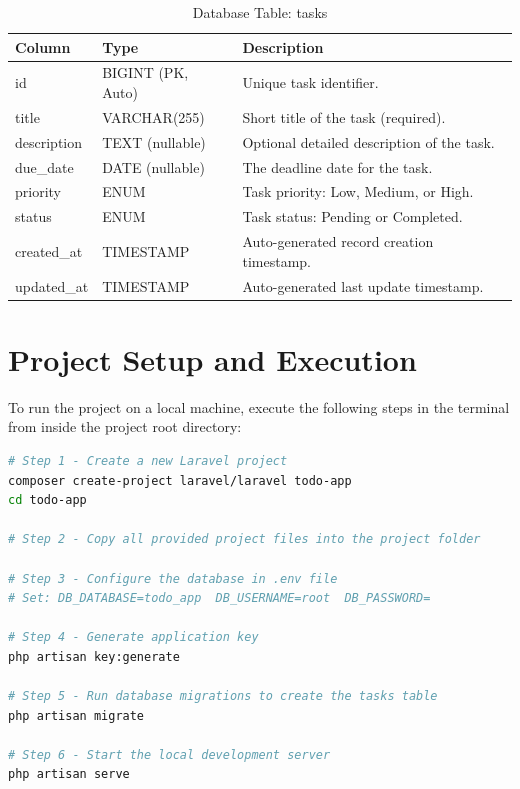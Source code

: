 \documentclass[12pt,a4paper]{report}
\begin{document}
\begin{table}[h!]
\centering
\caption{Database Table: tasks}
\label{tab:schema}
\renewcommand{\arraystretch}{1.3}
\begin{tabularx}{\textwidth}{@{}llX@{}}
\toprule
\textbf{Column} & \textbf{Type} & \textbf{Description} \\
\midrule
id          & BIGINT (PK, Auto) & Unique task identifier. \\
title       & VARCHAR(255)      & Short title of the task (required). \\
description & TEXT (nullable)   & Optional detailed description of the task. \\
due\_date   & DATE (nullable)   & The deadline date for the task. \\
priority    & ENUM              & Task priority: Low, Medium, or High. \\
status      & ENUM              & Task status: Pending or Completed. \\
created\_at & TIMESTAMP         & Auto-generated record creation timestamp. \\
updated\_at & TIMESTAMP         & Auto-generated last update timestamp. \\
\bottomrule
\end{tabularx}
\end{table}

\section{Project Setup and Execution}

To run the project on a local machine, execute the following steps in the terminal
from inside the project root directory:

\begin{lstlisting}[language=bash, caption={Project Setup Commands}]
# Step 1 - Create a new Laravel project
composer create-project laravel/laravel todo-app
cd todo-app

# Step 2 - Copy all provided project files into the project folder

# Step 3 - Configure the database in .env file
# Set: DB_DATABASE=todo_app  DB_USERNAME=root  DB_PASSWORD=

# Step 4 - Generate application key
php artisan key:generate

# Step 5 - Run database migrations to create the tasks table
php artisan migrate

# Step 6 - Start the local development server
php artisan serve
\end{lstlisting}
\end{document}
